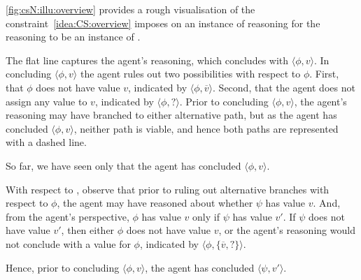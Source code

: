 \begin{note}[Figure]
  \autoref{fig:csN:illu:overview} provides a rough visualisation of the constraint~\ref{idea:CS:overview} imposes on an instance of reasoning for the reasoning to be an instance of \csN{}.

  The flat line captures the agent's reasoning, which concludes with \(\langle \phi, v \rangle\).
  In concluding \(\langle \phi,v \rangle\) the agent rules out two possibilities with respect to \(\phi\).
  First, that \(\phi\) does not have value \(v\), indicated by \(\langle \phi,\overline{v} \rangle\).
  Second, that the agent does not assign any value to \(v\), indicated by \(\langle \phi,? \rangle\).
  Prior to concluding \(\langle \phi,v \rangle\), the agent's reasoning may have branched to either alternative path, but as the agent has concluded \(\langle \phi,v \rangle\), neither path is viable, and hence both paths are represented with a dashed line.

  So far, we have seen only that the agent has concluded \(\langle \phi,v \rangle\).

  With respect to \csN{}, observe that prior to ruling out alternative branches with respect to \(\phi\), the agent may have reasoned about whether \(\psi\) has value \(v\).
  And, from the agent's perspective, \(\phi\) has value \(v\) only if \(\psi\) has value \(v'\).
  If \(\psi\) does not have value \(v'\), then either \(\phi\) does not have value \(v\), or the agent's reasoning would not conclude with a value for \(\phi\), indicated by \(\langle \phi,\{\overline{v},?\} \rangle\).

  Hence, prior to concluding \(\langle \phi,v \rangle\), the agent has concluded \(\langle \psi,v' \rangle\).
\end{note}

